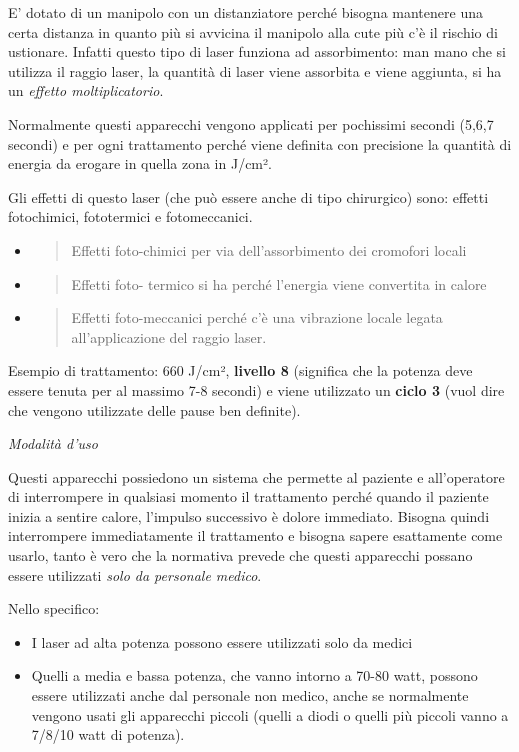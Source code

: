 \documentclass[]{article}
\begin{document}
E' dotato di un manipolo con un distanziatore perché bisogna mantenere
una certa distanza in quanto più si avvicina il manipolo alla cute più
c'è il rischio di ustionare. Infatti questo tipo di laser funziona ad
assorbimento: man mano che si utilizza il raggio laser, la quantità di
laser viene assorbita e viene aggiunta, si ha un \emph{effetto
moltiplicatorio}.

Normalmente questi apparecchi vengono applicati per pochissimi secondi
(5,6,7 secondi) e per ogni trattamento perché viene definita con
precisione la quantità di energia da erogare in quella zona in J/cm².

Gli effetti di questo laser (che può essere anche di tipo chirurgico)
sono: effetti fotochimici, fototermici e fotomeccanici.

\begin{itemize}
\item
  \begin{quote}
  Effetti foto-chimici per via dell'assorbimento dei cromofori locali
  \end{quote}
\item
  \begin{quote}
  Effetti foto- termico si ha perché l'energia viene convertita in
  calore
  \end{quote}
\item
  \begin{quote}
  Effetti foto-meccanici perché c'è una vibrazione locale legata
  all'applicazione del raggio laser.
  \end{quote}
\end{itemize}

Esempio di trattamento: 660 J/cm², \textbf{livello 8} (significa che la
potenza deve essere tenuta per al massimo 7-8 secondi) e viene
utilizzato un \textbf{ciclo 3} (vuol dire che vengono utilizzate delle
pause ben definite).

\emph{Modalità d'uso}

Questi apparecchi possiedono un sistema che permette al paziente e
all'operatore di interrompere in qualsiasi momento il trattamento perché
quando il paziente inizia a sentire calore, l'impulso successivo è
dolore immediato. Bisogna quindi interrompere immediatamente il
trattamento e bisogna sapere esattamente come usarlo, tanto è vero che
la normativa prevede che questi apparecchi possano essere utilizzati
\emph{solo da personale medico}.

Nello specifico:

\begin{itemize}
\item
  I laser ad alta potenza possono essere utilizzati solo da medici
\item
  Quelli a media e bassa potenza, che vanno intorno a 70-80 watt,
  possono essere utilizzati anche dal personale non medico, anche se
  normalmente vengono usati gli apparecchi piccoli (quelli a diodi o
  quelli più piccoli vanno a 7/8/10 watt di potenza).
\end{itemize}
\end{document}
